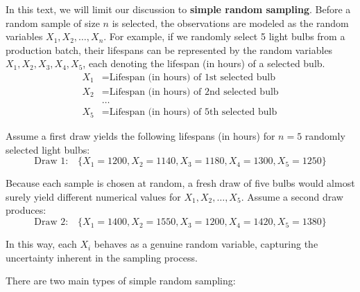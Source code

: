 \documentclass[twoside]{book}
\begin{document}
In this text, we will limit our discussion to \textbf{simple random sampling}.  Before a random sample of size $n$ is selected, the observations are modeled as the random variables $X_1 , X_2, \dots , X_n$. For example, if we randomly select 5 light bulbs from a production batch, their lifespans can be represented by the random variables \( X_1, X_2, X_3, X_4, X_5 \), each denoting the lifespan (in hours) of a selected bulb.
\begin{align*}
    X_1 &= \text{Lifespan (in hours) of 1st selected bulb} \\
    X_2 &= \text{Lifespan (in hours) of 2nd selected bulb} \\
    &\dots \\
    X_5 &= \text{Lifespan (in hours) of 5th selected bulb}
\end{align*}


Assume a first draw yields the following lifespans (in hours) for \(n = 5\) randomly selected light bulbs:
\[
\text{Draw 1:} \quad \{X_1=1200, X_2=1140, X_3=1180, X_4=1300, X_5=1250\}
\]

Because each sample is chosen at random, a fresh draw of five bulbs would almost surely yield different numerical values for \(X_1, X_2, \dots, X_5\). Assume a second draw produces:
\[
\text{Draw 2:} \quad \{X_1=1400, X_2=1550, X_3=1200, X_4=1420, X_5=1380\}
\]

In this way, each \(X_i\) behaves as a genuine random variable, capturing the uncertainty inherent in the sampling process.

There are two main types of simple random sampling:
\end{document}
